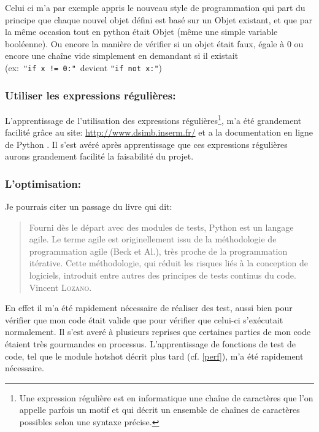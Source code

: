 Celui ci m'a par exemple appris le nouveau style de programmation qui part du principe que chaque nouvel objet défini est basé sur un Objet existant, et que par la même occasion tout en python était Objet (même une simple variable booléenne). Ou encore la manière de vérifier si un objet était faux, égale à 0 ou encore une chaîne vide simplement en demandant si il existait (ex:~\texttt{"if~x~!=~0:"}~devient \texttt{"if~not~x:"})

        \subsubsection{Utiliser les expressions régulières:} 
L'apprentissage de l'utilisation des expressions régulières\footnote{Une expression régulière est en informatique une chaîne de caractères que l’on appelle parfois un motif et qui décrit un ensemble de chaînes de caractères possibles selon une syntaxe précise.}, m'a été grandement facilité grâce au site: \url{http://www.dsimb.inserm.fr/}\cite{re} et a la documentation en ligne de Python . Il s'est avéré après apprentissage que ces expressions régulières aurons grandement facilité la faisabilité du projet.

        \subsubsection{L'optimisation:}
Je pourrais citer un passage du livre  qui dit:
\begin{quotation}
    Fourni dès le départ avec des modules de tests, Python est un langage agile. Le terme agile est originellement issu de la méthodologie de programmation agile (Beck et Al.), très proche de la programmation itérative. Cette méthodologie, qui réduit les risques liés à la conception de logiciels, introduit entre autres des principes de tests continus du code.
    \raggedleft Vincent \textsc{Lozano}.
\end{quotation}

En effet il m'a été rapidement nécessaire de réaliser des test, aussi bien pour vérifier que mon code était valide que pour vérifier que celui-ci s’exécutait normalement. Il s'est averé à plusieurs reprises que certaines parties de mon code étaient très gourmandes en processus. L’apprentissage de fonctions de test de code, tel que le module hotshot décrit plus tard (cf. \vref{perf}), m'a été rapidement nécessaire.

